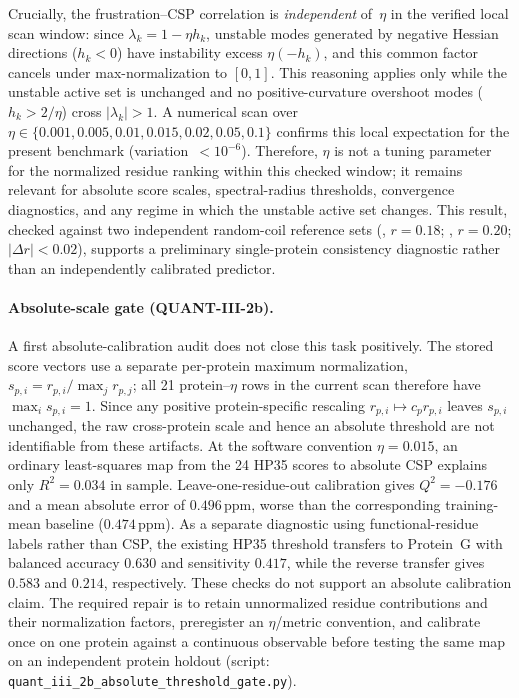 \documentclass[12pt,a4paper]{article}
\theoremstyle{remark}
\begin{document}
Crucially, the frustration--CSP correlation is \emph{independent} of~$\eta$ in the verified local scan window: since $\lambda_k = 1 - \eta h_k$, unstable modes generated by negative Hessian directions ($h_k < 0$) have instability excess $\eta(-h_k)$, and this common factor cancels under max-normalization to $[0,1]$. This reasoning applies only while the unstable active set is unchanged and no positive-curvature overshoot modes ($h_k > 2/\eta$) cross $|\lambda_k|>1$. A numerical scan over $\eta \in \{0.001, 0.005, 0.01, 0.015, 0.02, 0.05, 0.1\}$ confirms this local expectation for the present benchmark (variation~$< 10^{-6}$). Therefore, $\eta$ is not a tuning parameter for the normalized residue ranking within this checked window; it remains relevant for absolute score scales, spectral-radius thresholds, convergence diagnostics, and any regime in which the unstable active set changes. This result, checked against two independent random-coil reference sets (\citealp{Wishart1995}, $r = 0.18$; \citealp{KjaergaardPoulsen2011}, $r = 0.20$; $|\Delta r| < 0.02$), supports a preliminary single-protein consistency diagnostic rather than an independently calibrated predictor.

\paragraph{Absolute-scale gate (QUANT-III-2b).}
A first absolute-calibration audit does not close this task positively. The stored score vectors use a separate per-protein maximum normalization, $s_{p,i}=r_{p,i}/\max_j r_{p,j}$; all 21 protein--$\eta$ rows in the current scan therefore have $\max_i s_{p,i}=1$. Since any positive protein-specific rescaling $r_{p,i}\mapsto c_p r_{p,i}$ leaves $s_{p,i}$ unchanged, the raw cross-protein scale and hence an absolute threshold are not identifiable from these artifacts. At the software convention $\eta=0.015$, an ordinary least-squares map from the 24 HP35 scores to absolute CSP explains only $R^2=0.034$ in sample. Leave-one-residue-out calibration gives $Q^2=-0.176$ and a mean absolute error of $0.496$\,ppm, worse than the corresponding training-mean baseline ($0.474$\,ppm). As a separate diagnostic using functional-residue labels rather than CSP, the existing HP35 threshold transfers to Protein~G with balanced accuracy $0.630$ and sensitivity $0.417$, while the reverse transfer gives $0.583$ and $0.214$, respectively. These checks do not support an absolute calibration claim. The required repair is to retain unnormalized residue contributions and their normalization factors, preregister an $\eta$/metric convention, and calibrate once on one protein against a continuous observable before testing the same map on an independent protein holdout (script: \texttt{quant\_iii\_2b\_absolute\_threshold\_gate.py}).
\end{document}
